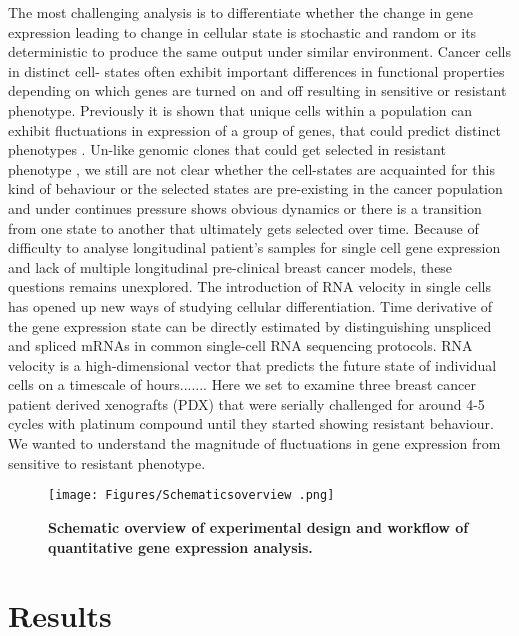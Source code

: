 \documentclass{nature}
\begin{document}
The most challenging analysis is to differentiate whether the change in gene expression leading to change in cellular state is stochastic\cite{raj2008nature} and random or its deterministic to produce the same output under similar environment.
Cancer cells in distinct cell- states often exhibit important differences in functional properties depending on which genes are turned on and off resulting in sensitive  or resistant phenotype.
Previously it is shown that unique cells within a population can exhibit fluctuations in expression of a group of genes, that could predict distinct phenotypes \cite{shaffer2019memory}.
Un-like genomic clones that could get selected in resistant phenotype \cite{salehi2020single}, we still are not clear whether the cell-states are acquainted for this kind of behaviour or the selected states are pre-existing in the cancer population and under continues pressure shows obvious dynamics or there is a transition from one state to another that ultimately gets selected over time. Because of difficulty to analyse longitudinal patient's samples for single cell gene expression and lack of multiple longitudinal pre-clinical breast cancer models, these questions remains unexplored.
The introduction of RNA velocity in single cells has opened up new ways of studying cellular differentiation. Time derivative of the gene expression state can be directly estimated by distinguishing unspliced and spliced mRNAs in common single-cell RNA sequencing protocols. RNA velocity is a high-dimensional vector that predicts the future state of individual cells on a timescale of hours.......
Here we set to examine three breast cancer patient derived xenografts (PDX) that were serially challenged for around 4-5 cycles with platinum compound until they started showing resistant behaviour. We wanted to understand the magnitude of fluctuations in gene expression from sensitive to resistant phenotype.

 


\begin{figure}
	\centering
	\texttt{[image: Figures/Schematicsoverview .png]}
	\caption[Establishment of]
	{\small
	    \textbf{Schematic overview of experimental design and workflow of quantitative gene expression analysis. 
} 
	}
	\label{fig:Schematicsoverview}
\end{figure}


\section*{Results}
\end{document}
